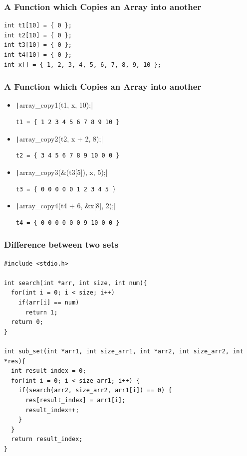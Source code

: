\documentclass{../c-lecture}
\begin{document}
\begin{frame}[fragile]
  \frametitle{A Function which Copies an Array into another}
  \begin{verbatim}
int t1[10] = { 0 };
int t2[10] = { 0 };
int t3[10] = { 0 };
int t4[10] = { 0 };
int x[] = { 1, 2, 3, 4, 5, 6, 7, 8, 9, 10 };
  \end{verbatim}
\end{frame}

\begin{frame}[fragile]
  \frametitle{A Function which Copies an Array into another}
  \begin{itemize}
    \item \texttt|array_copy1(t1, x, 10);|
    \begin{verbatim}
t1 = { 1 2 3 4 5 6 7 8 9 10 }
    \end{verbatim}
    \item \texttt|array_copy2(t2, x + 2, 8);|
    \begin{verbatim}
t2 = { 3 4 5 6 7 8 9 10 0 0 }
    \end{verbatim}
    \item \texttt|array_copy3(&(t3[5]), x, 5);|
    \begin{verbatim}
t3 = { 0 0 0 0 0 1 2 3 4 5 }
    \end{verbatim}
    \item \texttt|array_copy4(t4 + 6, &x[8], 2);|
    \begin{verbatim}
t4 = { 0 0 0 0 0 0 9 10 0 0 }
    \end{verbatim}
  \end{itemize}
\end{frame}

\begin{frame}[fragile]
  \frametitle{Difference between two sets}
  \scriptsize
  \begin{verbatim}
#include <stdio.h>

int search(int *arr, int size, int num){
  for(int i = 0; i < size; i++)
    if(arr[i] == num)
      return 1;
  return 0;
}

int sub_set(int *arr1, int size_arr1, int *arr2, int size_arr2, int *res){
  int result_index = 0;
  for(int i = 0; i < size_arr1; i++) {
    if(search(arr2, size_arr2, arr1[i]) == 0) {
      res[result_index] = arr1[i];
      result_index++;
    }
  }
  return result_index;
}
  \end{verbatim}
\end{frame}
\end{document}
